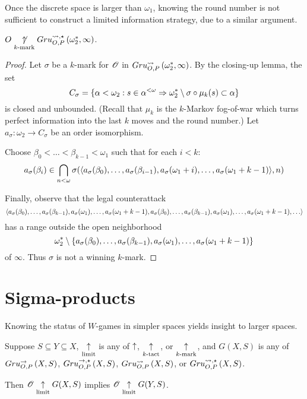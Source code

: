 Once the discrete space is larger than $\omega_1$, knowing the round number
is not sufficient to construct a limited information strategy, due to a
similar argument.

\begin{thm}
  $O\underset{k\text{-mark}}{\not\uparrow}Gru_{O,P}^{\leadsto,\star}\left({\omega^*_2},{\infty}\right)$.
\end{thm}

\begin{proof}
  Let $\sigma$ be a $k$-mark for $\mathscr{O}$ in
  $Gru_{O,P}^{\leadsto}\left({\omega^*_2},{\infty}\right)$. By the closing-up lemma, the set
    \[
      C_\sigma
        =
      \{
        \alpha<\omega_2
          :
        s\in\alpha^{<\omega}
          \Rightarrow
        \omega^*_2\setminus\sigma\circ\mu_k(s)
        \subset \alpha
      \}
    \]
  is closed and unbounded. (Recall that $\mu_k$ is the
  $k$-Markov fog-of-war which turns perfect information into the last $k$
  moves and the round number.) Let $a_\sigma:\omega_2\to C_\sigma$ be
  an order isomorphism.

  Choose $\beta_0<\dots<\beta_{k-1}<\omega_1$ such that for each $i<k$:
    \[
      a_\sigma(\beta_i)
        \in
      \bigcap_{n<\omega}
      \sigma(
        \langle a_\sigma(\beta_0),\dots,a_\sigma(\beta_{i-1}),
          a_\sigma(\omega_1+i),\dots,a_\sigma(\omega_1+k-1)\rangle,
      n)
    \]

  Finally, observe that the legal counterattack
    \[
      \<a_\sigma(\beta_0),\dots,a_\sigma(\beta_{k-1}),
        a_\sigma(\omega_1),\dots,a_\sigma(\omega_1+k-1),
        a_\sigma(\beta_0),\dots,a_\sigma(\beta_{k-1}),
        a_\sigma(\omega_1),\dots,a_\sigma(\omega_1+k-1),
        \dots\>
    \]
  has a range outside the open neighborhood %
    \[
      \omega^*_2
        \setminus
      \{a_\sigma(\beta_0),\dots,a_\sigma(\beta_{k-1}),
        a_\sigma(\omega_1),\dots,a_\sigma(\omega_1+k-1)\}
    \]
  of $\infty$. Thus $\sigma$ is not a winning $k$-mark.
\end{proof}



\section{Sigma-products}

Knowing the status of $W$-games in simpler spaces yields insight to larger
spaces.

\begin{prop}
  Suppose $S\subseteq Y\subseteq X$, $\underset{\text{limit}}{\uparrow}$ is any of $\uparrow$,
  $\underset{k\text{-tact}}{\uparrow}$, or $\underset{k\text{-mark}}{\uparrow}$, and $G(X,S)$ is any of $Gru_{O,P}^{\to}\left({X},{S}\right)$,
  $Gru_{O,P}^{\to,\star}\left({X},{S}\right)$, $Gru_{O,P}^{\leadsto}\left({X},{S}\right)$, or $Gru_{O,P}^{\leadsto,\star}\left({X},{S}\right)$.

  Then $\mathscr{O} \underset{\text{limit}}{\uparrow} G(X,S)$ implies $\mathscr{O} \underset{\text{limit}}{\uparrow} G(Y,S)$.
\end{prop}

